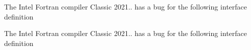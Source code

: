
\begin{DoxyRefList}
\item[Type \mbox{\hyperlink{interfaceArrayReplace__mod_1_1genReplaced}{Array\+Replace\+\_\+mod\+::gen\+Replaced}} ]\label{bug__bug000001}%
%
 The Intel Fortran compiler Classic 2021.. has a bug for the following interface definition  
\item[Type \mbox{\hyperlink{interfaceArrayReplace__mod_1_1getReplaced}{Array\+Replace\+\_\+mod\+::get\+Replaced}} ]\label{bug__bug000002}%
%
 The Intel Fortran compiler Classic 2021.. has a bug for the following interface definition 
\end{DoxyRefList}